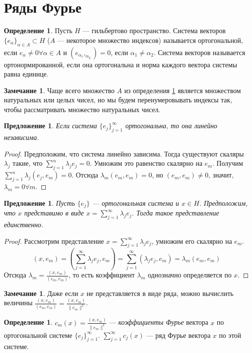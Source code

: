 \documentclass[11pt,openany,a4paper]{scrartcl}
\theoremstyle{plain}
\newtheorem{proposition}[theorem]{Предложение}
\theoremstyle{definition}
\newtheorem{definition}[theorem]{Определение}
\newtheorem{remark}[theorem]{Замечание}
\begin{document}
\section{Ряды Фурье}

\begin{definition}\label{orthogonal_system}
    Пусть $H$ — гильбертово пространство. Система векторов
    $\{e_\alpha\}_{\alpha \in A} \subset H$ ($A$ — некоторое множество индексов)
    называется ортогональной, если $e_\alpha \neq 0 \forall \alpha \in A$ и
    $(e_{\alpha_1}, _{\alpha_2}) = 0$, если $\alpha_1 \neq \alpha_2$. Система
    векторов называется ортонормированной, если она ортогональна и норма каждого
    вектора системы равна единице.
\end{definition}

\begin{remark}
    Чаще всего множество $A$ из определения \ref{orthogonal_system} является
    множеством натуральных или целых чисел, но мы будем перенумеровывать индексы 
    так, чтобы рассматривать множество натуральных чисел.
\end{remark}

\begin{proposition}
    Если система $\{e_j\}_{j=1}^\infty$ ортогональна, то она линейно независима.
\end{proposition}
\begin{proof}
    Предположим, что система линейно зависима. Тогда существуют скаляры
    $\lambda_j$ такие, что $\sum\limits_{j=1}^n \lambda_je_j = 0$. Умножим
    это равенство скалярно на $e_m$. Получим
    $\sum\limits_{j=1}^n \lambda_j(e_j, e_m) = 0$. Отсюда
    $\lambda_m(e_m, e_m) = 0$, но $(e_m, e_m) \neq 0$, значит,
    $\lambda_m = 0 \forall m$.
\end{proof}

\begin{proposition}
    Пусть $\{e_j\}$ — ортогональная система и $x\in H$. Предположим, что $x$ 
    представимо в виде $x = \sum\limits_{j=1}^\infty \lambda_je_j$. Тогда такое
    представление единственно.
\end{proposition}
\begin{proof}
    Рассмотрим представление $x = \sum\limits_{j=1}^\infty \lambda_je_j$, умножим 
    его скалярно на $e_m$.
    $$
    (x, e_m) = (\sum\limits_{j=1}^\infty \lambda_je_j, e_m) =
    \sum\limits_{j=1}^\infty(\lambda_je_j, e_m) = \lambda_m(e_m, e_m)
    $$
    Отсюда $\lambda_m = \frac{(x, e_m)}{(e_m, e_m)}$, то есть коэффициент
    $\lambda_m$ однозначно определяется по $x$.
\end{proof}
\begin{remark}
    Даже если $x$ не представляется в виде ряда, можно вычислить величины
    $\frac{(x, e_m)}{(e_m, e_m)} = \frac{(x, e_m)}{\|e_m\|^2}$.
\end{remark}
\begin{definition}
    $c_m(x) = \frac{(x, e_m)}{\|e_m\|^2}$ — \emph{коэффициенты Фурье} вектора
    $x$ по ортогональной системе $\{e_j\}_{j=1}^\infty$.
    $\sum\limits_{j=1}^\infty c_j(x)$ — ряд Фурье вектора $x$ по этой системе.
\end{definition}
\end{document}

